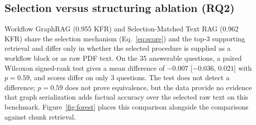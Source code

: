 \documentclass[preprint,10pt]{elsarticle}
\begin{document}
\begin{table}[!htbp]
\centering
\caption{Key-fact recall by question category for the primary comparison systems on \nVerified{} verified questions. Procedural category also includes step coverage.}
\label{tab:percat}
\small
\setlength{\tabcolsep}{4pt}
\resizebox{\textwidth}{!}{%
}
\end{table}

\subsection{Selection versus structuring ablation (RQ2)}
\label{sec:ablation-results}
Workflow GraphRAG (0.955 KFR) and Selection-Matched Text RAG (0.962 KFR) share the selection mechanism (Eq.~\eqref{eq:score}) and the top-3 supporting retrieval and differ only in whether the selected procedure is supplied as a workflow block or as raw PDF text. On the 35 answerable questions, a paired Wilcoxon signed-rank test gives a mean difference of $-0.007$ [$-0.036$, $0.021$] with $p=0.59$, and scores differ on only 3 questions. The test does not detect a difference; $p=0.59$ does not prove equivalence, but the data provide no evidence that graph serialization adds factual accuracy over the selected raw text on this benchmark. Figure~\ref{fig:forest} places this comparison alongside the comparisons against chunk retrieval.
\end{document}

